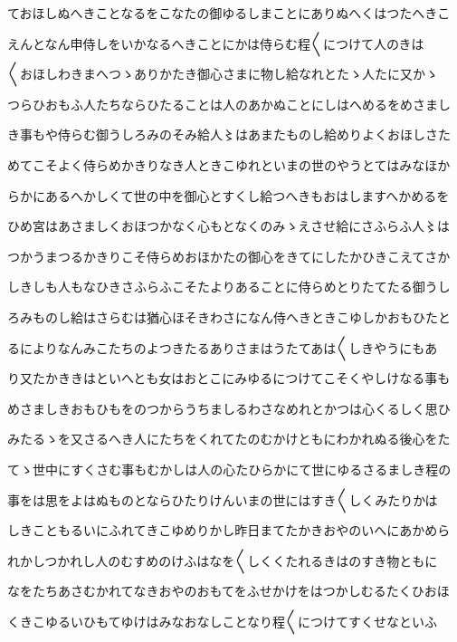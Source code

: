 \documentclass[a4paper,11pt,landscape]{ltjtarticle}
\begin{document}
\par\medskip
ておほしぬへきことなるをこなたの御ゆるしまことにありぬへくはつたへきこ
\par\medskip
えんとなん申侍しをいかなるへきことにかは侍らむ程〱につけて人のきは
\par\medskip
〱おほしわきまへつゝありかたき御心さまに物し給なれとたゝ人たに又かゝ
\par\medskip
つらひおもふ人たちならひたることは人のあかぬことにしはへめるをめさまし
\par\medskip
き事もや侍らむ御うしろみのそみ給人〻はあまたものし給めりよくおほしさた
\par\medskip
めてこそよく侍らめかきりなき人ときこゆれといまの世のやうとてはみなほか
\par\medskip
らかにあるへかしくて世の中を御心とすくし給つへきもおはしますへかめるを
\par\medskip
ひめ宮はあさましくおほつかなく心もとなくのみゝえさせ給にさふらふ人〻は
\par\medskip
つかうまつるかきりこそ侍らめおほかたの御心をきてにしたかひきこえてさか
\par\medskip
しきしも人もなひきさふらふこそたよりあることに侍らめとりたてたる御うし
\par\medskip
ろみものし給はさらむは猶心ほそきわさになん侍へきときこゆしかおもひたと
\par\medskip
るによりなんみこたちのよつきたるありさまはうたてあは〱しきやうにもあ
\par\medskip
り又たかききはといへとも女はおとこにみゆるにつけてこそくやしけなる事も
\par\medskip
めさましきおもひもをのつからうちましるわさなめれとかつは心くるしく思ひ
\par\medskip
みたるゝを又さるへき人にたちをくれてたのむかけともにわかれぬる後心をた
\par\medskip
てゝ世中にすくさむ事もむかしは人の心たひらかにて世にゆるさるましき程の
\par\medskip
事をは思をよはぬものとならひたりけんいまの世にはすき〱しくみたりかは
\par\medskip
しきこともるいにふれてきこゆめりかし昨日まてたかきおやのいへにあかめら
\par\medskip
れかしつかれし人のむすめのけふはなを〱しくくたれるきはのすき物ともに
\par\medskip
なをたちあさむかれてなきおやのおもてをふせかけをはつかしむるたくひおほ
\par\medskip
くきこゆるいひもてゆけはみなおなしことなり程〱につけてすくせなといふ
\par\medskip
\end{document}
